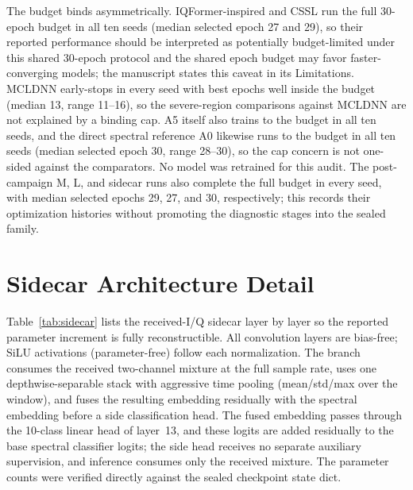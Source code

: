 \documentclass[letterpaper,onecolumn,11pt,journal]{IEEEtran}
\begin{document}
The budget binds asymmetrically. IQFormer-inspired and CSSL run the full
30-epoch budget in all ten seeds (median selected epoch 27 and 29), so their
reported performance should be interpreted as potentially budget-limited under
this shared 30-epoch protocol and the shared epoch budget may favor
faster-converging
models; the manuscript states this caveat in its Limitations. MCLDNN
early-stops in every seed with best epochs well inside the budget (median 13,
range 11--16), so the severe-region comparisons against MCLDNN are not
explained by a binding cap. A5 itself also trains to the budget in all ten
seeds, and the direct spectral reference A0 likewise runs to the budget in
all ten seeds (median selected epoch 30, range 28--30), so the cap concern
is not one-sided against the comparators. No model
was retrained for this audit. The post-campaign M, L, and sidecar runs also
complete the full budget in every seed, with median selected epochs 29, 27,
and 30, respectively; this records their optimization histories without
promoting the diagnostic stages into the sealed family.

\section{Sidecar Architecture Detail}
Table~\ref{tab:sidecar} lists the received-I/Q sidecar layer by layer so the
reported parameter increment is fully reconstructible. All convolution layers
are bias-free; SiLU activations (parameter-free) follow each normalization.
The branch consumes the received two-channel mixture at the full sample rate,
uses one depthwise-separable stack with aggressive time pooling
(mean/std/max over the window), and fuses the resulting embedding residually
with the spectral embedding before a side classification head. The fused
embedding passes through the 10-class linear head of layer~13, and these
logits are added residually to the base spectral classifier logits; the side
head receives no separate auxiliary supervision, and inference consumes only
the received mixture. The parameter
counts were verified directly against the sealed checkpoint state dict.
\end{document}
